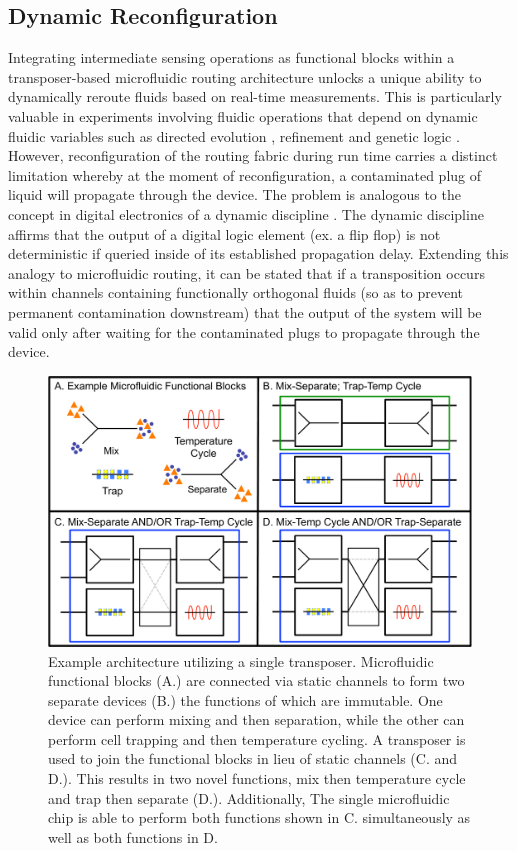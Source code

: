 \subsection{Dynamic Reconfiguration}
Integrating intermediate sensing operations as functional blocks within a transposer-based microfluidic routing architecture unlocks a unique ability to dynamically reroute fluids based on real-time measurements. This is particularly valuable in experiments involving fluidic operations that depend on dynamic fluidic variables such as directed evolution \cite{wang2014microfluidic}, refinement \cite{swain2013thinking} and genetic logic \cite{tamsir2011}. However, reconfiguration of the routing fabric during run time carries a distinct limitation whereby at the moment of reconfiguration, a contaminated plug of liquid will propagate through the device. The problem is analogous to the concept in digital electronics of a dynamic discipline \cite{Harris+Harris}. The dynamic discipline affirms that the output of a digital logic element (ex. a flip flop) is not deterministic if queried inside of its established propagation delay. Extending this analogy to microfluidic routing, it can be stated that if a transposition occurs within channels containing functionally orthogonal fluids (so as to prevent permanent contamination downstream) that the output of the system will be valid only after waiting for the contaminated plugs to propagate through the device.
\begin{figure}[h]
     \begin{minipage}[t]{0.99\linewidth}\centering
      \includegraphics[width=14cm]{fig10.pdf}
      \medskip
     \end{minipage}\hfill
     \caption[Example of a functional, programmable microfluidic architecture]{Example architecture utilizing a single transposer. Microfluidic functional blocks (A.) are connected via static channels to form two separate devices (B.) the functions of which are immutable. One device can perform mixing and then separation, while the other can perform cell trapping and then temperature cycling. A transposer is used to join the functional blocks in lieu of static channels (C. and D.). This results in two novel functions, mix then temperature cycle and trap then separate (D.). Additionally, The single microfluidic chip is able to perform both functions shown in C. simultaneously as well as both functions in D.}
	\label{fig:example}
\end{figure}
